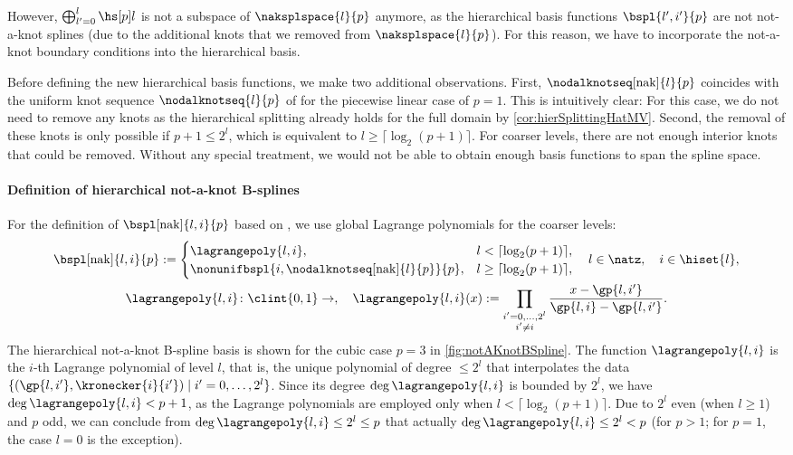 However, $\bigoplus_{l'=0}^l \hsbspl{l}{p}$ is not a subspace of
$\naksplspace{l}{p}$ anymore,
as the hierarchical basis functions $\bspl{l',i'}{p}$ are not
not-a-knot splines (due to the additional knots that we removed from
$\naksplspace{l}{p}$).
For this reason,
we have to incorporate the not-a-knot boundary conditions into the
hierarchical basis.

Before defining the new hierarchical basis functions,
we make two additional observations.
First, $\nodalknotseq[\nak]{l}{p}$ coincides with the
uniform knot sequence $\nodalknotseq{l}{p}$ of 
for the piecewise linear case of $p = 1$.
This is intuitively clear:
For this case,
we do not need to remove any knots as the hierarchical splitting already
holds for the full domain by \cref{cor:hierSplittingHatMV}.
Second, the removal of these knots is only possible if $p + 1 \le 2^l$,
which is equivalent to $l \ge \lceil\log_2(p+1)\rceil$.
For coarser levels,
there are not enough interior knots that could be removed.
Without any special treatment,
we would not be able to obtain enough basis functions to span the spline space.

\paragraph{Definition of hierarchical not-a-knot B-splines}

For the definition of 
$\bspl[\nak]{l,i}{p}$ based on ,
we use global Lagrange polynomials for the coarser levels:
\begin{subequations}
   \label{eq:hierarchicalNotAKnotBSpline}
  \begin{gather}
    \bspl[\nak]{l,i}{p}
    :=
    \begin{cases}
      \lagrangepoly{l,i},&
      l < \lceil\log_2(p+1)\rceil,\\
      \nonunifbspl{i,\nodalknotseq[\nak]{l}{p}}{p},&
      l \ge \lceil\log_2(p+1)\rceil,
    \end{cases}\quad
    l \in \natz,\quad
    i \in \hiset{l},\\
    \lagrangepoly{l,i}\colon \clint{0, 1} \to \real,\quad
    \lagrangepoly{l,i}(x)
    := \prod_{\substack{i'=0,\dotsc,2^l\\i'\not=i}}
    \frac{x - \gp{l,i'}}{\gp{l,i} - \gp{l,i'}}.
  \end{gather}
\end{subequations}
The hierarchical not-a-knot B-spline basis is shown for the
cubic case $p = 3$ in \cref{fig:notAKnotBSpline}.
The function $\lagrangepoly{l,i}$ is the $i$-th Lagrange polynomial of level $l$,
that is,
the unique polynomial of degree $\le 2^l$ that interpolates the data
$\{(\gp{l,i'}, \kronecker{i}{i'}) \mid i' = 0, \dotsc, 2^l\}$.
Since its degree $\deg \lagrangepoly{l,i}$ is bounded by $2^l$,
we have $\deg \lagrangepoly{l,i} < p + 1$,
as the Lagrange polynomials are employed only when
$l < \lceil\log_2(p+1)\rceil$.
Due to $2^l$ even (when $l \ge 1$) and $p$ odd,
we can conclude from $\deg \lagrangepoly{l,i} \le 2^l \le p$ that actually
$\deg \lagrangepoly{l,i} \le 2^l < p$
(for $p > 1$; for $p = 1$, the case $l = 0$ is the exception).

